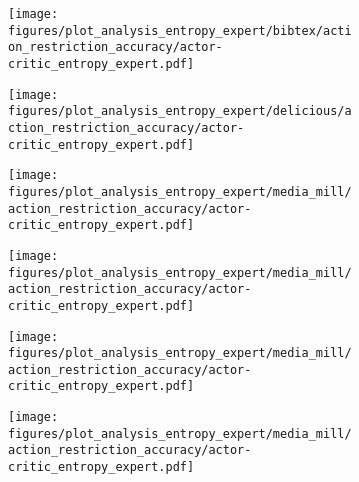 \begin{figure}[H]
    \begin{subfigure}[b]{0.32\columnwidth}
        \centering
        \texttt{[image: figures/plot\_analysis\_entropy\_expert/bibtex/action\_restriction\_accuracy/actor-critic\_entropy\_expert.pdf]}
    \end{subfigure}
    \hfill
    \begin{subfigure}[b]{0.32\columnwidth}
        \centering
        \texttt{[image: figures/plot\_analysis\_entropy\_expert/delicious/action\_restriction\_accuracy/actor-critic\_entropy\_expert.pdf]}
    \end{subfigure}
    \hfill
    \begin{subfigure}[b]{0.32\columnwidth}
        \centering
        \texttt{[image: figures/plot\_analysis\_entropy\_expert/media\_mill/action\_restriction\_accuracy/actor-critic\_entropy\_expert.pdf]}
    \end{subfigure}
    \hfill

     \begin{subfigure}[b]{0.32\columnwidth}
        \centering
        \texttt{[image: figures/plot\_analysis\_entropy\_expert/media\_mill/action\_restriction\_accuracy/actor-critic\_entropy\_expert.pdf]}
    \end{subfigure}
    \hfill
     \begin{subfigure}[b]{0.32\columnwidth}
        \centering
        \texttt{[image: figures/plot\_analysis\_entropy\_expert/media\_mill/action\_restriction\_accuracy/actor-critic\_entropy\_expert.pdf]}
    \end{subfigure}
    \hfill
     \begin{subfigure}[b]{0.32\columnwidth}
        \centering
        \texttt{[image: figures/plot\_analysis\_entropy\_expert/media\_mill/action\_restriction\_accuracy/actor-critic\_entropy\_expert.pdf]}
    \end{subfigure}
    \hfill
    
   
\end{figure}


